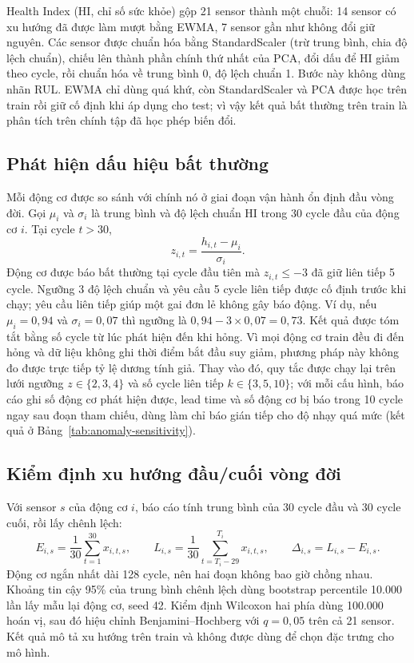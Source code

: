 Health Index (HI, chỉ số sức khỏe) gộp 21 sensor thành một chuỗi: 14 sensor có xu
hướng đã được làm mượt bằng EWMA, 7 sensor gần như không đổi giữ nguyên. Các
sensor được chuẩn hóa bằng StandardScaler (trừ trung bình, chia độ lệch chuẩn),
chiếu lên thành phần chính thứ nhất của PCA, đổi dấu để HI giảm theo cycle, rồi
chuẩn hóa về trung bình 0, độ lệch chuẩn 1. Bước này không dùng nhãn RUL. EWMA chỉ
dùng quá khứ, còn StandardScaler và PCA được học trên train rồi giữ cố định khi áp
dụng cho test; vì vậy kết quả bất thường trên train là phân tích trên chính tập đã
học phép biến đổi.

\subsection{Phát hiện dấu hiệu bất thường}
\label{sec:anomaly-method}
Mỗi động cơ được so sánh với chính nó ở giai đoạn vận hành ổn định đầu vòng đời.
Gọi $\mu_i$ và $\sigma_i$ là trung bình và độ lệch chuẩn HI trong 30 cycle đầu
của động cơ $i$. Tại cycle $t>30$,
\begin{equation}
 z_{i,t}=\frac{h_{i,t}-\mu_i}{\sigma_i}.
 \label{eq:anomaly-z}
\end{equation}
Động cơ được báo bất thường tại cycle đầu tiên mà $z_{i,t}\leq-3$ đã giữ liên tiếp
5 cycle. Ngưỡng 3 độ lệch chuẩn và yêu cầu 5 cycle liên tiếp được cố định trước
khi chạy; yêu cầu liên tiếp giúp một gai đơn lẻ không gây báo động. Ví dụ, nếu
$\mu_i=0{,}94$ và $\sigma_i=0{,}07$ thì ngưỡng là $0{,}94-3\times0{,}07=0{,}73$.
Kết quả được tóm tắt bằng số cycle từ lúc phát hiện đến khi hỏng. Vì mọi động cơ
train đều đi đến hỏng và dữ liệu không ghi thời điểm bắt đầu suy giảm, phương pháp
này không đo được trực tiếp tỷ lệ dương tính giả. Thay vào đó, quy tắc được chạy
lại trên lưới ngưỡng $z\in\{2,3,4\}$ và số cycle liên tiếp $k\in\{3,5,10\}$; với
mỗi cấu hình, báo cáo ghi số động cơ phát hiện được, lead time và số động cơ bị báo
trong 10 cycle ngay sau đoạn tham chiếu, dùng làm chỉ báo gián tiếp cho độ nhạy
quá mức (kết quả ở Bảng~\ref{tab:anomaly-sensitivity}).

\subsection{Kiểm định xu hướng đầu/cuối vòng đời}
\label{sec:paired-method}
Với sensor $s$ của động cơ $i$, báo cáo tính trung bình của 30 cycle đầu và 30
cycle cuối, rồi lấy chênh lệch:
\begin{equation}
 E_{i,s}=\frac{1}{30}\sum_{t=1}^{30}x_{i,t,s},\qquad
 L_{i,s}=\frac{1}{30}\sum_{t=T_i-29}^{T_i}x_{i,t,s},\qquad
 \Delta_{i,s}=L_{i,s}-E_{i,s}.
 \label{eq:paired-difference}
\end{equation}
Động cơ ngắn nhất dài 128 cycle, nên hai đoạn không bao giờ chồng nhau. Khoảng tin
cậy 95\% của trung bình chênh lệch dùng bootstrap percentile 10.000 lần lấy mẫu
lại động cơ, seed 42. Kiểm định Wilcoxon hai phía dùng 100.000 hoán vị, sau đó hiệu
chỉnh Benjamini--Hochberg với $q=0{,}05$ trên cả 21 sensor. Kết quả mô tả xu hướng
trên train và không được dùng để chọn đặc trưng cho mô hình.

